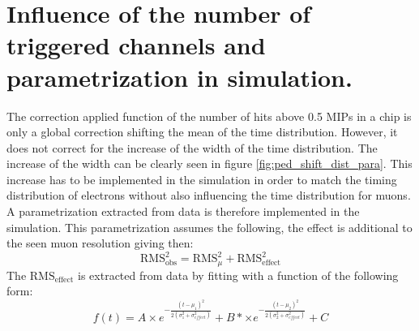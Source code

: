 \chapter{Influence of the number of triggered channels and parametrization in simulation.}
\label{appendix:ped_shift}

The correction applied function of the number of hits above 0.5 MIPs in a chip is only a global correction shifting the mean of the time distribution. However, it does not correct for the increase of the width of the time distribution. The increase of the width can be clearly seen in figure \ref{fig:ped_shift_dist_para}. This increase has to be implemented in the simulation in order to match the timing distribution of electrons without also influencing the time distribution for muons. A parametrization extracted from data is therefore implemented in the simulation. This parametrization assumes the following, the effect is additional to the seen muon resolution giving then:
\begin{equation*}
	\text{RMS}_{\text{obs}}^2 = \text{RMS}_{\mu}^2 + \text{RMS}_{\text{effect}}^2
\end{equation*}
The $\text{RMS}_{\text{effect}}$ is extracted from data by fitting with a function of the following form:
\begin{equation*}
	f(t) = A \times e^{-\frac{(t-\mu_1)^2}{2(\sigma_1^2 + \sigma_{effect}^2)}} + B* \times e^{-\frac{(t-\mu_2)^2}{2(\sigma_2^2 + \sigma_{effect}^2)}} + C
\end{equation*}

